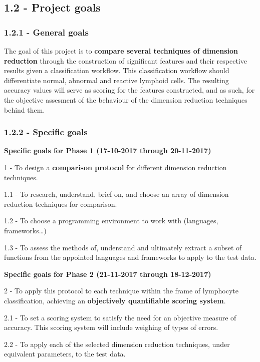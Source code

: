 \documentclass[]{article}
\begin{document}
\subsection{1.2 - Project goals}\label{project-goals}

\subsubsection{1.2.1 - General goals}\label{general-goals}

The goal of this project is to \textbf{compare several techniques of
dimension reduction} through the construction of significant features
and their respective results given a classification workflow. This
classification workflow should differentiate normal, abnormal and
reactive lymphoid cells. The resulting accuracy values will serve as
scoring for the features constructed, and as such, for the objective
assesment of the behaviour of the dimension reduction techniques behind
them.

\subsubsection{1.2.2 - Specific goals}\label{specific-goals}

\textbf{Specific goals for Phase 1 (17-10-2017 through 20-11-2017)}

1 - To design a \textbf{comparison protocol} for different dimension
reduction techniques.

1.1 - To research, understand, brief on, and choose an array of
dimension reduction techniques for comparison.

1.2 - To choose a programming environment to work with (languages,
frameworks\ldots{})

1.3 - To assess the methods of, understand and ultimately extract a
subset of functions from the appointed languages and frameworks to apply
to the test data.

\textbf{Specific goals for Phase 2 (21-11-2017 through 18-12-2017)}

2 - To apply this protocol to each technique within the frame of
lymphocyte classification, achieving an \textbf{objectively quantifiable
scoring system}.

2.1 - To set a scoring system to satisfy the need for an objective
measure of accuracy. This scoring system will include weighing of types
of errors.

2.2 - To apply each of the selected dimension reduction techniques,
under equivalent parameters, to the test data.
\end{document}
